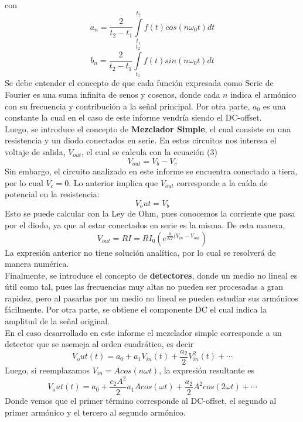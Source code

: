con
$$a_n=\frac{2}{t_2-t_1}\int\limits_{t_1}^{t_2}f(t)cos(n\omega_0t)dt$$
$$b_n=\frac{2}{t_2-t_1}\int\limits_{t_1}^{t_2}f(t)sin(n\omega_0t)dt$$
Se debe entender el concepto de que cada función expresada como Serie de Fourier es una suma infinita de senos y cosenos, donde cada $n$ indica el armónico con su frecuencia y contribución a la señal principal. Por otra parte, $a_0$ es una constante la cual en el caso de este informe vendría siendo el DC-offset.\\
Luego, se introduce el concepto de \textbf{Mezclador Simple}, el cual consiste en una resistencia y un diodo conectados en serie. En estos circuitos nos interesa el voltaje de salida, $V_{out}$, el cual se calcula con la ecuación (3)
\begin{equation}
    V_{out}=V_b-V_c
\end{equation}
Sin embargo, el circuito analizado en este informe se encuentra conectado a tiera, por lo cual $V_c=0$. Lo anterior implica que $V_{out}$ corresponde a la caída de potencial en la resistencia:
$$V_out=V_b$$
Esto se puede calcular con la Ley de Ohm, pues conocemos la corriente que pasa por el diodo, ya que al estar conectados en serie es la misma. De esta manera,
\begin{equation}
    V_{out}=RI=RI_0\left(e^{\frac{q}{KT}(V_{in}-V_{out}}\right)
\end{equation}
La expresión anterior no tiene solución analítica, por lo cual se resolverá de manera numérica.\\
Finalmente, se introduce el concepto de \textbf{detectores}, donde un medio no lineal es útil como tal, pues las frecuencias muy altas no pueden ser procesadas a gran rapidez, pero al pasarlas por un medio no lineal se pueden estudiar sus armónicos fácilmente.
Por otra parte, se obtiene el componente DC el cual indica la amplitud de la señal original.\\
En el caso desarrollado en este informe el mezclador simple corresponde a un detector que se asemeja al orden cuadrático, es decir
\begin{equation}
    V_out(t)=a_0+a_1V_{in}(t)+\frac{a_2}{2}V_{in}^2(t)+\cdots
\end{equation}
Luego, si reemplazamos $V_{in}=Acos(n\omega t)$, la expresión resultante es
$$V_out(t)=a_0+\frac{c_2A^2}{2}a_1Acos(\omega t)+\frac{a_2}{2}A^2cos(2\omega t)+\cdots$$
Donde vemos que el primer término corresponde al DC-offset, el segundo al primer armónico y el tercero al segundo armónico.
